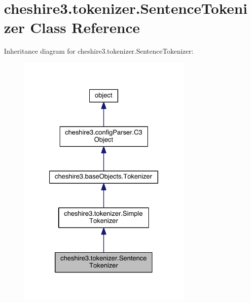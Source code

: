 \hypertarget{classcheshire3_1_1tokenizer_1_1_sentence_tokenizer}{\section{cheshire3.\-tokenizer.\-Sentence\-Tokenizer Class Reference}
\label{classcheshire3_1_1tokenizer_1_1_sentence_tokenizer}
}


Inheritance diagram for cheshire3.\-tokenizer.\-Sentence\-Tokenizer\-:
\nopagebreak
\begin{figure}[H]
\begin{center}
\leavevmode
\includegraphics[width=244pt]{classcheshire3_1_1tokenizer_1_1_sentence_tokenizer__inherit__graph}
\end{center}
\end{figure}


